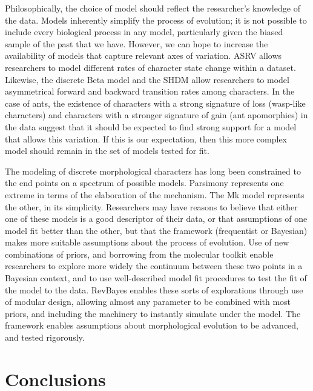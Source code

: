 \documentclass[]{article}
\begin{document}
Philosophically, the choice of model should reflect the researcher's knowledge of the data. 
Models inherently simplify the process of evolution; it is not possible to include every biological process in any model, particularly given the biased sample of the past that we have.
However, we can hope to increase the availability of models that capture relevant axes of variation. 
ASRV allows researchers to model different rates of character state change within a dataset.
Likewise, the discrete Beta model and the SHDM allow researchers to model asymmetrical forward and backward transition rates among characters. 
In the case of ants, the existence of characters with a strong signature of loss (wasp-like characters) and characters with a stronger signature of gain (ant apomorphies) in the data suggest that it should be expected to find strong support for a model that allows this variation.
If this is our expectation, then this more complex model should remain in the set of models tested for fit. \par
The modeling of discrete morphological characters has long been constrained to the end points on a spectrum of possible models. 
Parsimony represents one extreme in terms of the elaboration of the mechanism. 
The Mk model represents the other, in its simplicity.
Researchers may have reasons to believe that either one of these models is a good descriptor of their data, or that assumptions of one model fit better than the other, but that the framework (frequentist or Bayesian) makes more suitable assumptions about the process of evolution.
Use of new combinations of priors, and borrowing from the molecular toolkit enable researchers to explore more widely the continuum between these two points in a Bayesian context, and to use well-described model fit procedures to test the fit of the model to the data.
RevBayes enables these sorts of explorations through use of modular design, allowing almost any parameter to be combined with most priors, and including the machinery to instantly simulate under the model.
The framework enables assumptions about morphological evolution to be advanced, and tested rigorously.
 \par

\section{Conclusions}
\end{document}

